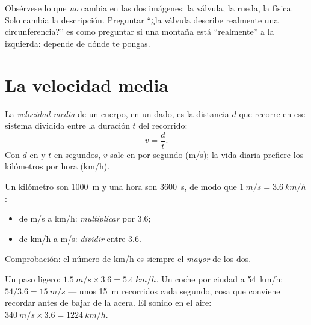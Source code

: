 \begin{remark}
Obsérvese lo que \emph{no} cambia en las dos imágenes: la válvula, la
rueda, la física. Solo cambia la descripción. Preguntar ``¿la válvula
describe realmente una circunferencia?'' es como preguntar si una
montaña está ``realmente'' a la izquierda: depende de dónde te pongas.
\end{remark}

\section{La velocidad media}

\begin{definition}\label{def:g10:relative-motion:speed}
La \emph{velocidad media} de un cuerpo, en un
 dado, es la distancia $d$ que recorre en ese
sistema dividida entre la duración $t$ del recorrido:
\[
v = \frac{d}{t} .
\]
Con $d$ en  y $t$ en segundos, $v$ sale en  por segundo
(\unit{m/s}); la vida diaria prefiere los kilómetros por hora
(\unit{km/h}).
\end{definition}

\begin{method}\label{met:g10:relative-motion:convert}
Un kilómetro son \qty{1000}{m} y una hora son \qty{3600}{s}, de modo que
$\qty{1}{m/s} = \qty{3.6}{km/h}$:
\begin{itemize}
  \item de \unit{m/s} a \unit{km/h}: \emph{multiplicar} por $3.6$;
  \item de \unit{km/h} a \unit{m/s}: \emph{dividir} entre $3.6$.
\end{itemize}
Comprobación: el número de \unit{km/h} es siempre el \emph{mayor} de los
dos.
\end{method}

\begin{example}\label{ex:g10:relative-motion:convert}
Un paso ligero: $\qty{1.5}{m/s} \times 3.6 = \qty{5.4}{km/h}$. Un coche
por ciudad a \qty{54}{km/h}: $54 / 3.6 = \qty{15}{m/s}$ --- unos
\qty{15}{m} recorridos cada segundo, cosa que conviene recordar antes de
bajar de la acera. El sonido en el aire:
$\qty{340}{m/s} \times 3.6 = \qty{1224}{km/h}$.
\end{example}

